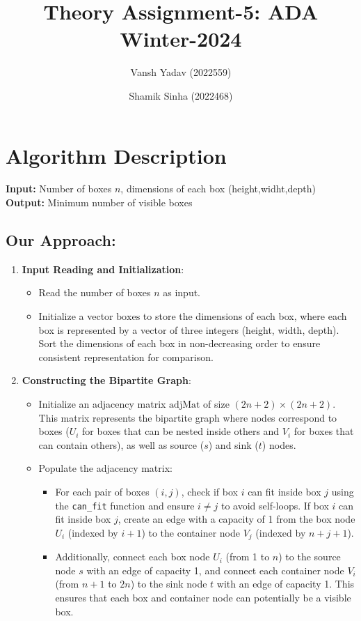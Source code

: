\documentclass{article}
\title{Theory Assignment-5: ADA Winter-2024}
\author{Vansh Yadav (2022559) \and Shamik Sinha (2022468)}
\date{}
\begin{document}
\maketitle
\section{Algorithm Description}
\textbf{Input:} Number of boxes \( n \), dimensions of each box (height,widht,depth)
\\
\textbf{Output:} Minimum number of visible boxes

\subsection*{Our Approach:}

\begin{enumerate}
    \item \textbf{Input Reading and Initialization}:
    \begin{itemize}
        \item Read the number of boxes \( n \) as input.
        \item Initialize a vector \( \text{boxes} \) to store the dimensions of each box, where each box is represented by a vector of three integers (height, width, depth). Sort the dimensions of each box in non-decreasing order to ensure consistent representation for comparison.
    \end{itemize}
    
    \item \textbf{Constructing the Bipartite Graph}:
    \begin{itemize}
        \item Initialize an adjacency matrix \( \text{adjMat} \) of size \( (2n + 2) \times (2n + 2) \). This matrix represents the bipartite graph where nodes correspond to boxes (\( U_i \) for boxes that can be nested inside others and \( V_i \) for boxes that can contain others), as well as source (\( s \)) and sink (\( t \)) nodes.
        \item Populate the adjacency matrix:
        \begin{itemize}
            \item For each pair of boxes \( (i, j) \), check if box \( i \) can fit inside box \( j \) using the \texttt{can\_fit} function and ensure \( i \neq j \) to avoid self-loops. If box \( i \) can fit inside box \( j \), create an edge with a capacity of 1 from the box node \( U_i \) (indexed by \( i+1 \)) to the container node \( V_j \) (indexed by \( n+j+1 \)).
            \item Additionally, connect each box node \( U_i \) (from 1 to \( n \)) to the source node \( s \) with an edge of capacity 1, and connect each container node \( V_i \) (from \( n+1 \) to \( 2n \)) to the sink node \( t \) with an edge of capacity 1. This ensures that each box and container node can potentially be a visible box.
        \end{itemize}
    \end{itemize}
    

\end{enumerate}
\end{document}
